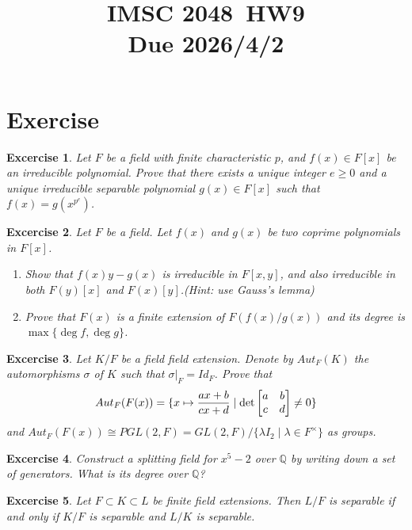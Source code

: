 \documentclass{article}
\title{IMSC 2048\ HW9 \\ Due 2026/4/2}
\newtheorem{exer}{Excercise}
\newcommand{\Q}{\mathbb{Q}}
\begin{document}
\maketitle
\section{Exercise}
\begin{exer}
  Let $F$ be a field with finite characteristic $p$, and $f(x)\in F[x]$ be an irreducible polynomial. Prove that there exists a unique integer $e\ge 0$ and a unique irreducible separable polynomial $g(x)\in F[x]$ such that $f(x)=g(x^{p^e})$.
\end{exer}


\begin{exer}
  Let $F$ be a field. Let $f(x)$ and $g(x)$ be two coprime polynomials in $F[x]$. 
  \begin{enumerate}
  \item Show that $f(x)y-g(x)$ is irreducible in $F[x,y]$, and also irreducible in both $F(y)[x]$ and $F(x)[y]$.(Hint: use Gauss's lemma)
  \item Prove that $F(x)$ is a finite extension of $F(f(x)/g(x))$ and its degree is $\max\{\deg f, \deg g\}$.
  \end{enumerate}
\end{exer}

 
    \begin{exer}
        Let $K/F$ be a field field extension. Denote by $Aut_F(K)$ the automorphisms $\sigma$ of $K$ such that $\sigma|_F=Id_F$. Prove that 
        $$Aut_F(F(x))=\{x\mapsto {ax+b\over cx+d}\mid \det \begin{bmatrix}
        a&b\\
        c&d
        \end{bmatrix}\neq 0
        \}$$ and $Aut_F(F(x))\cong PGL(2, F)= GL(2, F)/\{\lambda I_2\mid \lambda\in F^\times\}$ as groups.
    \end{exer}



    \begin{exer}
        Construct a splitting field for $x^5-2$ over $\Q$ by writing down a set of generators. What is its degree over $\Q$?
    \end{exer}

    


\begin{exer}       
        Let $F\subset K\subset L$ be finite field extensions. Then $L/F$ is separable if and only if $K/F$ is separable and $L/K$ is separable.
\end{exer}
\end{document}
